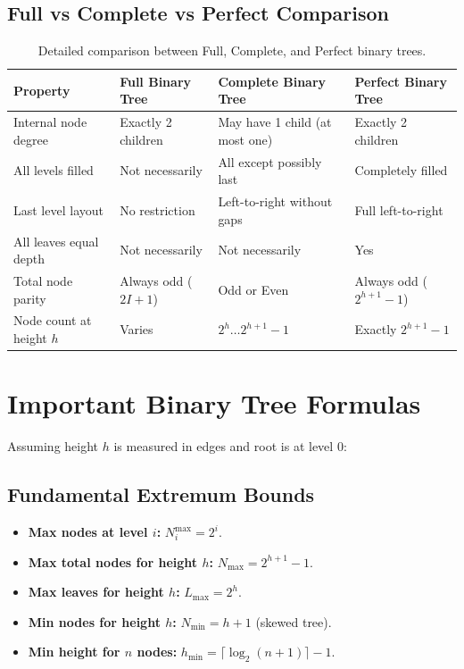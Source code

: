 \subsection{Full vs Complete vs Perfect Comparison}

\begin{table}[htbp]
\centering
\small
\begin{tabularx}{\textwidth}{l X X X}
\toprule
\textbf{Property} & \textbf{Full Binary Tree} & \textbf{Complete Binary Tree} & \textbf{Perfect Binary Tree} \\
\midrule
Internal node degree    & Exactly 2 children        & May have 1 child (at most one) & Exactly 2 children \\
All levels filled       & Not necessarily           & All except possibly last      & Completely filled \\
Last level layout       & No restriction            & Left-to-right without gaps    & Full left-to-right \\
All leaves equal depth  & Not necessarily           & Not necessarily               & Yes \\
Total node parity       & Always odd ($2I+1$)       & Odd or Even                   & Always odd ($2^{h+1}-1$) \\
Node count at height $h$& Varies                    & $2^h \dots 2^{h+1}-1$         & Exactly $2^{h+1}-1$ \\
\bottomrule
\end{tabularx}
\caption{Detailed comparison between Full, Complete, and Perfect binary trees.}
\end{table}

\section{Important Binary Tree Formulas}

Assuming height $h$ is measured in edges and root is at level $0$:

\subsection{Fundamental Extremum Bounds}
\begin{itemize}
    \item \textbf{Max nodes at level $i$:} $N_i^{\max} = 2^i$.
    \item \textbf{Max total nodes for height $h$:} $N_{\max} = 2^{h+1} - 1$.
    \item \textbf{Max leaves for height $h$:} $L_{\max} = 2^h$.
    \item \textbf{Min nodes for height $h$:} $N_{\min} = h + 1$ (skewed tree).
    \item \textbf{Min height for $n$ nodes:} $h_{\min} = \lceil \log_2(n + 1) \rceil - 1$.
\end{itemize}

